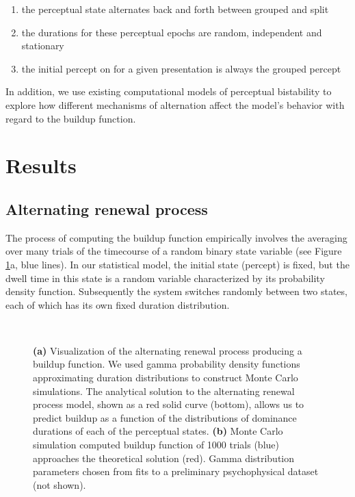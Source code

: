 \begin{enumerate}
\item the perceptual state alternates back and forth between grouped and split
\item the durations for these perceptual epochs are random, independent and stationary
\item the initial percept on for a given presentation is always the grouped percept
\end{enumerate}

In addition, we use existing computational models of perceptual bistability to explore how different mechanisms of alternation affect the model's behavior with regard to the buildup function.

\section{Results}
\subsection*{Alternating renewal process}

The process of computing the buildup function empirically involves the averaging over many trials of the timecourse of a random binary state variable (see Figure \ref{fig:makingBUFs}a, blue lines). In our statistical model, the initial state (percept) is fixed, but the dwell time in this state is a random variable characterized by its probability density function. Subsequently the system switches randomly between two states, each of which has its own fixed duration distribution.

\begin{figure}	
	\centering
	
	   \\
	  \vspace{20 pt}
   
	\caption{\textbf{(a)} Visualization of the alternating renewal process producing a buildup function. We used gamma probability density functions approximating duration distributions to construct Monte Carlo simulations. The analytical solution to the alternating renewal process model, shown as a red solid curve (bottom), allows us to predict buildup as a function of the distributions of dominance durations of each of the perceptual states. \textbf{(b)} Monte Carlo simulation computed buildup function of 1000 trials (blue) approaches the theoretical solution (red). Gamma distribution parameters chosen from fits to a preliminary psychophysical dataset (not shown).}
	\label{fig:makingBUFs}
\end{figure}

